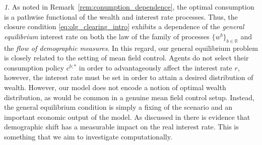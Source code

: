 \documentclass[11pt,oneside,english,reqno,dvipsnames,table]{amsart}
\numberwithin{equation}{section}
\theoremstyle{plain}
\theoremstyle{definition}
\theoremstyle{remark}
\newtheorem{rem}[thm]{\protect\remarkname}
\theoremstyle{plain}
\theoremstyle{plain}
\theoremstyle{plain}
\theoremstyle{plain}
\theoremstyle{plain}
\theoremstyle{plain}
\theoremstyle{plain}
\providecommand{\remarkname}{Remark}
\providecommand{\remarkname}{Remark}
\newcommand{\mbR}{\mathbb{R}}
\numberwithin{thm}{section}
\begin{document}
\begin{rem}
   As noted in Remark~\ref{rem:conumption_dependence}, the optimal consumption is a pathwise functional of the wealth and interest rate processes. Thus, the closure condition \eqref{eq:olg_clearing_intro} exhibits a dependence of the \emph{general equilibrium} interest rate on both the law of the family of processes $\{w^b\}_{b\in \mbR}$ and the \emph{flow of demographic measures}. In this regard, our general equilibrium problem is closely related to the setting of mean field control. Agents do not select their consumption policy $c^{b;*}$ in order to advantageously affect the interest rate $r$, however, the interest rate must be set in order to attain a desired distribution of wealth. However, our model does not encode a notion of optimal wealth distribution, as would be common in a genuine mean field control setup. Instead, the general equilibrium condition is simply a fixing of the scenario and an important economic output of the model. As discussed in \cite{carvalho2016} there is evidence that demographic shift has a measurable impact on the real interest rate. This is something that we aim to investigate computationally.
     

\end{rem}
\end{document}
